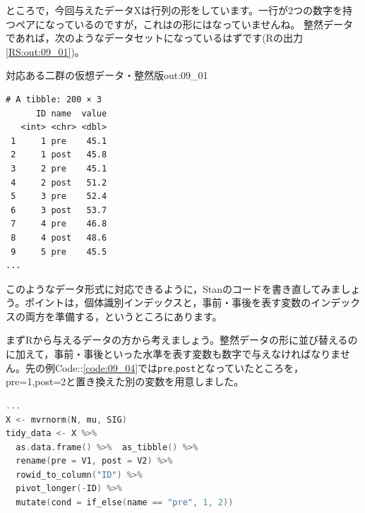 \documentclass{ltjsbook}
\begin{document}
ところで，今回与えたデータXは行列の形をしています。一行が2つの数字を持つペアになっているのですが，これはの形にはなっていませんね。
整然データであれば，次のようなデータセットになっているはずです(Rの出力\ref{RS:out:09_01})。
\begin{Rscreen}{対応ある二群の仮想データ・整然版}{out:09_01}
	\begin{verbatim}
# A tibble: 200 × 3
      ID name  value
   <int> <chr> <dbl>
 1     1 pre    45.1
 2     1 post   45.8
 3     2 pre    45.1
 4     2 post   51.2
 5     3 pre    52.4
 6     3 post   53.7
 7     4 pre    46.8
 8     4 post   48.6
 9     5 pre    45.5
...

\end{verbatim}
\end{Rscreen}
このようなデータ形式に対応できるように，Stanのコードを書き直してみましょう。ポイントは，個体識別インデックスと，事前・事後を表す変数のインデックスの両方を準備する，というところにあります。

まずRから与えるデータの方から考えましょう。整然データの形に並び替えるのに加えて，事前・事後といった水準を表す変数も数字で与えなければなりません。先の例Code::\ref{code:09_04}では\verb|pre|,\verb|post|となっていたところを，pre=1,post=2と置き換えた別の変数を用意しました。
\begin{lstlisting}[language=c++,label={code:09_04},caption={対応ある二群の仮想データ・整然版}]
...
X <- mvrnorm(N, mu, SIG)
tidy_data <- X %>%
  as.data.frame() %>%  as_tibble() %>%
  rename(pre = V1, post = V2) %>%
  rowid_to_column("ID") %>%
  pivot_longer(-ID) %>%
  mutate(cond = if_else(name == "pre", 1, 2))
\end{lstlisting}
\end{document}
